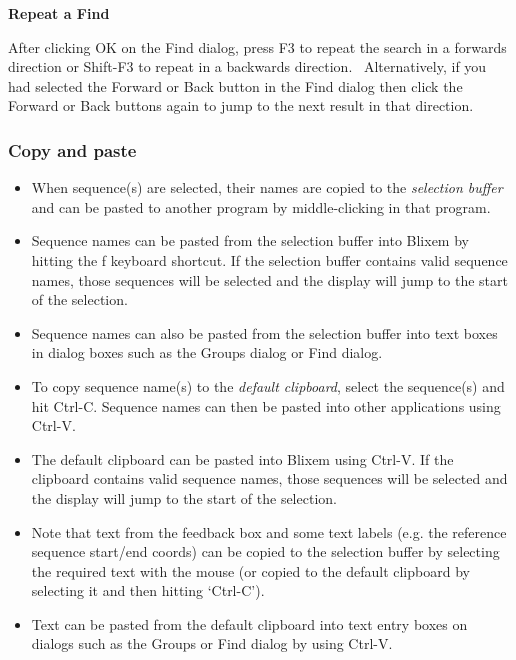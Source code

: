 \documentclass[letterpaper]{article}
\newcommand\liststyleWWviiiNumxxvi{%
\renewcommand\labelitemi{{\textbullet}}
\renewcommand\labelitemii{o}
\renewcommand\labelitemiii{[F0A7?]}
\renewcommand\labelitemiv{[F0B7?]}
}
\begin{document}
\bigskip

{\bfseries
Repeat a Find}

{
After clicking OK on the Find dialog, press F3 to repeat the search in a
forwards direction or Shift-F3 to repeat in a backwards direction.
\ Alternatively, if you had selected the Forward or Back button in the
Find dialog then click the Forward or Back buttons again to jump to the
next result in that direction.}

{\color[rgb]{0.30980393,0.5058824,0.7411765}\subsubsection[Copy and paste]{Copy and paste}}
\hypertarget{RefHeading1981056909880}{}\liststyleWWviiiNumxxvi
\begin{itemize}
\item {
When sequence(s) are selected, their names are copied to the
\textit{selection buffer }and can be pasted to another program by
middle-clicking in that program.}
\item {
Sequence names can be pasted from the selection buffer into Blixem by
hitting the {\textquotesingle}f{\textquotesingle} keyboard shortcut. If
the selection buffer contains valid sequence names, those sequences
will be selected and the display will jump to the start of the
selection.}
\item {
Sequence names can also be pasted from the selection buffer into text
boxes in dialog boxes such as the Groups dialog or Find dialog.}
\item {
To copy sequence name(s) to the \textit{default clipboard}, select the
sequence(s) and hit Ctrl-C. Sequence names can then be pasted into
other applications using Ctrl-V.}
\item {
The default clipboard can be pasted into Blixem using Ctrl-V. If the
clipboard contains valid sequence names, those sequences will be
selected and the display will jump to the start of the selection.}
\item {
Note that text from the feedback box and some text labels (e.g. the
reference sequence start/end coords) can be copied to the selection
buffer by selecting the required text with the mouse (or copied to the
default clipboard by selecting it and then hitting
{\textquoteleft}Ctrl-C{\textquoteright}).}
\item {
Text can be pasted from the default clipboard into text entry boxes on
dialogs such as the Groups or Find dialog by using Ctrl-V.}
\end{itemize}
\end{document}
